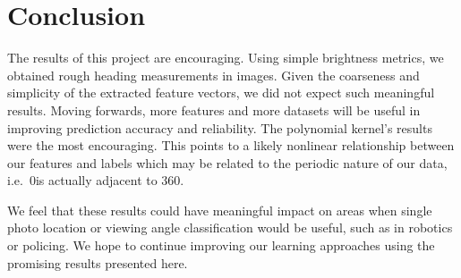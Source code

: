 \documentclass{article}
\begin{document}
\section{Conclusion}

The results of this project are encouraging. Using simple brightness metrics, we obtained rough heading measurements in images. Given the coarseness and simplicity of the extracted feature vectors, we did not expect such meaningful results. Moving forwards, more features and more datasets will be useful in improving prediction accuracy and reliability. The polynomial kernel's results were the most encouraging. This points to a likely nonlinear relationship between our features and labels which may be related to the periodic nature of our data, i.e.\ 0\degrees is actually adjacent to 360\degrees.

We feel that these results could have meaningful impact on areas when single photo location or viewing angle classification would be useful, such as in robotics or policing. We hope to continue improving our learning approaches using the promising results presented here.



\end{document}
